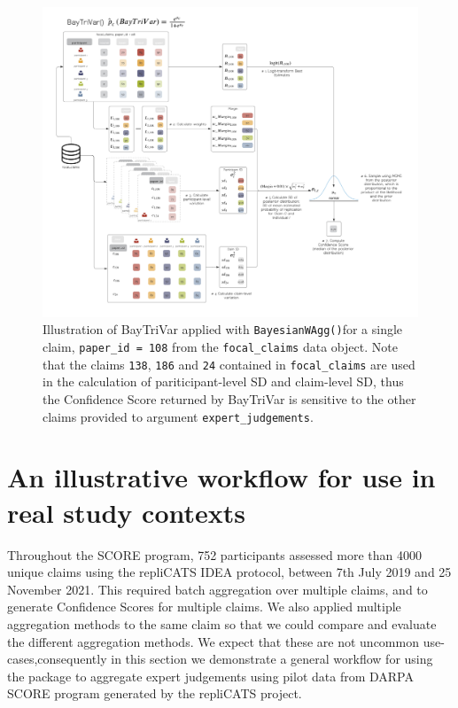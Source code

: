 \documentclass[article]{jss}
\newcommand{\blandscape}{\begin{landscape}}
\newcommand{\elandscape}{\end{landscape}}
\begin{document}
\newpage
\blandscape

\begin{figure}

{\centering \includegraphics[width=9.375in,height=\textheight]{images/BayesianWAgg.png}

}

\caption{\label{fig-BayesianWAgg}Illustration of BayTriVar applied with
\texttt{BayesianWAgg()}for a single claim, \texttt{paper\_id\ =\ 108}
from the \texttt{focal\_claims} data object. Note that the claims
\texttt{138}, \texttt{186} and \texttt{24} contained in
\texttt{focal\_claims} are used in the calculation of pariticipant-level
SD and claim-level SD, thus the Confidence Score returned by BayTriVar
is sensitive to the other claims provided to argument
\texttt{expert\_judgements}.}

\end{figure}

\newpage
\elandscape

\hypertarget{sec-workflow}{%
\section{An illustrative workflow for use in real study
contexts}\label{sec-workflow}}

Throughout the SCORE program, 752 participants assessed more than 4000
unique claims using the repliCATS IDEA protocol, between 7th July 2019
and 25 November 2021. This required batch aggregation over multiple
claims, and to generate Confidence Scores for multiple claims. We also
applied multiple aggregation methods to the same claim so that we could
compare and evaluate the different aggregation methods. We expect that
these are not uncommon use-cases,consequently in this section we
demonstrate a general workflow for using the  package to
aggregate expert judgements using pilot data from DARPA SCORE program
generated by the repliCATS project.
\end{document}
